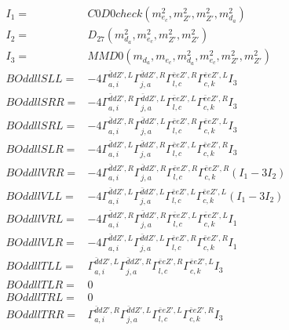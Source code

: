 \documentclass[A4,landscape]{article}
\begin{document}
\begin{align} 
I_1 = & C0D0check(m^2_{e_{{c}}}, m^2_{{Z'}}, m^2_{{Z'}}, m^2_{d_{{a}}}) \\ 
I_2 = & D_{27}(m^2_{d_{{a}}}, m^2_{e_{{c}}}, m^2_{{Z'}}, m^2_{{Z'}}) \\ 
I_3 = & MMD0(m_{d_{{a}}}, m_{e_{{c}}}, m^2_{d_{{a}}}, m^2_{e_{{c}}}, m^2_{{Z'}}, m^2_{{Z'}}) \\ 
  BOddllSLL= & -4  \Gamma^{\bar{d}d {Z'} ,L}_{a, i} \Gamma^{\bar{d}d {Z'} ,R}_{j, a} \Gamma^{\bar{e}e {Z'} ,R}_{l, c} \Gamma^{\bar{e}e {Z'} ,L}_{c, k} I_3 \\ 
  BOddllSRR= & -4  \Gamma^{\bar{d}d {Z'} ,R}_{a, i} \Gamma^{\bar{d}d {Z'} ,L}_{j, a} \Gamma^{\bar{e}e {Z'} ,L}_{l, c} \Gamma^{\bar{e}e {Z'} ,R}_{c, k} I_3 \\ 
  BOddllSRL= & -4  \Gamma^{\bar{d}d {Z'} ,R}_{a, i} \Gamma^{\bar{d}d {Z'} ,L}_{j, a} \Gamma^{\bar{e}e {Z'} ,R}_{l, c} \Gamma^{\bar{e}e {Z'} ,L}_{c, k} I_3 \\ 
  BOddllSLR= & -4  \Gamma^{\bar{d}d {Z'} ,L}_{a, i} \Gamma^{\bar{d}d {Z'} ,R}_{j, a} \Gamma^{\bar{e}e {Z'} ,L}_{l, c} \Gamma^{\bar{e}e {Z'} ,R}_{c, k} I_3 \\ 
  BOddllVRR= & -4  \Gamma^{\bar{d}d {Z'} ,R}_{a, i} \Gamma^{\bar{d}d {Z'} ,R}_{j, a} \Gamma^{\bar{e}e {Z'} ,R}_{l, c} \Gamma^{\bar{e}e {Z'} ,R}_{c, k} (I_1 - 3 I_2) \\ 
  BOddllVLL= & -4  \Gamma^{\bar{d}d {Z'} ,L}_{a, i} \Gamma^{\bar{d}d {Z'} ,L}_{j, a} \Gamma^{\bar{e}e {Z'} ,L}_{l, c} \Gamma^{\bar{e}e {Z'} ,L}_{c, k} (I_1 - 3 I_2) \\ 
  BOddllVRL= & -4  \Gamma^{\bar{d}d {Z'} ,R}_{a, i} \Gamma^{\bar{d}d {Z'} ,R}_{j, a} \Gamma^{\bar{e}e {Z'} ,L}_{l, c} \Gamma^{\bar{e}e {Z'} ,L}_{c, k} I_1 \\ 
  BOddllVLR= & -4  \Gamma^{\bar{d}d {Z'} ,L}_{a, i} \Gamma^{\bar{d}d {Z'} ,L}_{j, a} \Gamma^{\bar{e}e {Z'} ,R}_{l, c} \Gamma^{\bar{e}e {Z'} ,R}_{c, k} I_1 \\ 
  BOddllTLL= &  \Gamma^{\bar{d}d {Z'} ,L}_{a, i} \Gamma^{\bar{d}d {Z'} ,R}_{j, a} \Gamma^{\bar{e}e {Z'} ,R}_{l, c} \Gamma^{\bar{e}e {Z'} ,L}_{c, k} I_3 \\ 
  BOddllTLR= & 0 \\ 
  BOddllTRL= & 0 \\ 
  BOddllTRR= &  \Gamma^{\bar{d}d {Z'} ,R}_{a, i} \Gamma^{\bar{d}d {Z'} ,L}_{j, a} \Gamma^{\bar{e}e {Z'} ,L}_{l, c} \Gamma^{\bar{e}e {Z'} ,R}_{c, k} I_3 \\ 
\end{align} 
\end{document}
